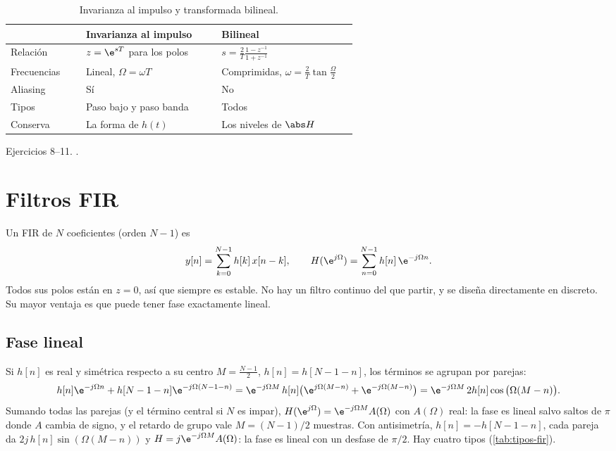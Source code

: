 \documentclass[11pt,a4paper]{scrartcl}
\begin{document}
\begin{table}[ht]
  \centering\small
  \caption{Invarianza al impulso y transformada bilineal.}\label{tab:invarianza-bilineal}
  \begin{tabular}{@{}p{0.2\linewidth}p{0.36\linewidth}p{0.36\linewidth}@{}}
    \toprule
    & Invarianza al impulso & Bilineal\\\midrule
    Relación & $z=\e^{sT}$ para los polos & $s=\frac2T\frac{1-z^{-1}}{1+z^{-1}}$\\
    Frecuencias & Lineal, $\Omega=\omega T$ & Comprimidas, $\omega=\frac2T\tan\frac\Omega2$\\
    Aliasing & Sí & No\\
    Tipos & Paso bajo y paso banda & Todos\\
    Conserva & La forma de $h(t)$ & Los niveles de $\abs H$\\\bottomrule
  \end{tabular}
\end{table}

\begin{flushright}\small\color{pdsgris}Ejercicios 8–11. .\end{flushright}

\section{Filtros FIR}\label{sec:fir}

Un FIR de $N$ coeficientes (orden $N-1$) es
\[
  y[n]=\sum_{k=0}^{N-1}h[k]\,x[n-k],\qquad H(\e^{j\Omega})=\sum_{n=0}^{N-1}h[n]\,\e^{-j\Omega n}.
\]
Todos sus polos están en $z=0$, así que siempre es estable. No hay un filtro continuo del que partir, y se diseña directamente en discreto. Su mayor ventaja es que puede tener fase exactamente lineal.

\subsection{Fase lineal}

Si $h[n]$ es real y simétrica respecto a su centro $M=\frac{N-1}{2}$, $h[n]=h[N-1-n]$, los términos se agrupan por parejas:
\[
  h[n]\e^{-j\Omega n}+h[N-1-n]\e^{-j\Omega(N-1-n)}=\e^{-j\Omega M}\,h[n]\big(\e^{j\Omega(M-n)}+\e^{-j\Omega(M-n)}\big)=\e^{-j\Omega M}\,2h[n]\cos\big(\Omega(M-n)\big).
\]
Sumando todas las parejas (y el término central si $N$ es impar), $H(\e^{j\Omega})=\e^{-j\Omega M}A(\Omega)$ con $A(\Omega)$ real: la fase es lineal salvo saltos de $\pi$ donde $A$ cambia de signo, y el retardo de grupo vale $M=(N-1)/2$ muestras. Con antisimetría, $h[n]=-h[N-1-n]$, cada pareja da $2j\,h[n]\sin(\Omega(M-n))$ y $H=j\e^{-j\Omega M}A(\Omega)$: la fase es lineal con un desfase de $\pi/2$. Hay cuatro tipos (\cref{tab:tipos-fir}).
\end{document}
